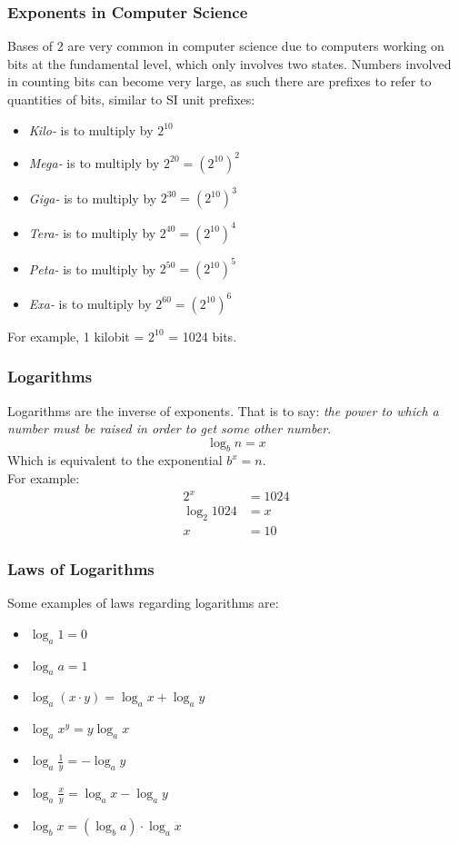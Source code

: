 \documentclass{article}
\begin{document}
\subsubsection{Exponents in Computer Science}
Bases of 2 are very common in computer science due to computers working on bits at the fundamental level,
which only involves two states.
Numbers involved in counting bits can become very large, as such there are prefixes to refer to quantities of bits,
similar to SI unit prefixes:
\begin{itemize}
    \item \emph{Kilo-} is to multiply by \(2^{10}\)
    \item \emph{Mega-} is to multiply by \(2^{20} = (2^{10})^2\)
    \item \emph{Giga-} is to multiply by \(2^{30} = (2^{10})^3\)
    \item \emph{Tera-} is to multiply by \(2^{40} = (2^{10})^4\)
    \item \emph{Peta-} is to multiply by \(2^{50} = (2^{10})^5\)
    \item \emph{Exa-} is to multiply by \(2^{60} = (2^{10})^6\)
\end{itemize}
For example, 1 kilobit = \(2^{10}\) = 1024 bits.
%
\subsubsection{Logarithms}
Logarithms are the inverse of exponents.
That is to say: \emph{the power to which a number must be raised in order to get some other number}.\\
\[\log_b n = x\]
Which is equivalent to the exponential \(b^x = n\).\\
For example:
\begin{align}
    2^x & = 1024\\
    \log_2 1024 & = x\\
    x & = 10
\end{align}
%
\subsubsection{Laws of Logarithms}
Some examples of laws regarding logarithms are:
\begin{itemize}
    \item \(\log_a 1 = 0\)
    \item \(\log_a a = 1\)
    \item \(\log_a (x \cdot y) = \log_a x + \log_a y\)
    \item \(\log_a x^y = y \log_a x\)
    \item \(\log_a \frac{1}{y} = -\log_a y\)
    \item \(\log_a \frac{x}{y} = \log_a x - \log_a y\)
    \item \(\log_b x = (\log_b a) \cdot \log_a x\)
\end{itemize}
%
\end{document}
